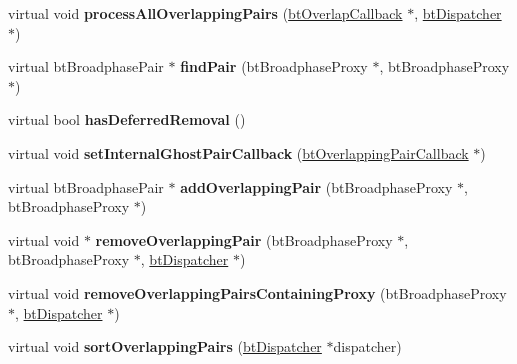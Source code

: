 \begin{DoxyCompactItemize}
\item 
\hypertarget{classbt_null_pair_cache_a39c6b95bf7412b8f37dba2efa633ce09}{virtual void {\bfseries process\+All\+Overlapping\+Pairs} (\hyperlink{structbt_overlap_callback}{bt\+Overlap\+Callback} $\ast$, \hyperlink{classbt_dispatcher}{bt\+Dispatcher} $\ast$)}\label{classbt_null_pair_cache_a39c6b95bf7412b8f37dba2efa633ce09}

\item 
\hypertarget{classbt_null_pair_cache_a1932ebc5d729f0f31528f7647b1c0ab9}{virtual bt\+Broadphase\+Pair $\ast$ {\bfseries find\+Pair} (bt\+Broadphase\+Proxy $\ast$, bt\+Broadphase\+Proxy $\ast$)}\label{classbt_null_pair_cache_a1932ebc5d729f0f31528f7647b1c0ab9}

\item 
\hypertarget{classbt_null_pair_cache_a937a29216d8c7585d8c710f84745bd1b}{virtual bool {\bfseries has\+Deferred\+Removal} ()}\label{classbt_null_pair_cache_a937a29216d8c7585d8c710f84745bd1b}

\item 
\hypertarget{classbt_null_pair_cache_a5cb33e9d3694c71fe68038580da8cc69}{virtual void {\bfseries set\+Internal\+Ghost\+Pair\+Callback} (\hyperlink{classbt_overlapping_pair_callback}{bt\+Overlapping\+Pair\+Callback} $\ast$)}\label{classbt_null_pair_cache_a5cb33e9d3694c71fe68038580da8cc69}

\item 
\hypertarget{classbt_null_pair_cache_a76137e4519323ff5589d5702752bc2cb}{virtual bt\+Broadphase\+Pair $\ast$ {\bfseries add\+Overlapping\+Pair} (bt\+Broadphase\+Proxy $\ast$, bt\+Broadphase\+Proxy $\ast$)}\label{classbt_null_pair_cache_a76137e4519323ff5589d5702752bc2cb}

\item 
\hypertarget{classbt_null_pair_cache_a436b8c6da50f69e53425abb7cdc7976c}{virtual void $\ast$ {\bfseries remove\+Overlapping\+Pair} (bt\+Broadphase\+Proxy $\ast$, bt\+Broadphase\+Proxy $\ast$, \hyperlink{classbt_dispatcher}{bt\+Dispatcher} $\ast$)}\label{classbt_null_pair_cache_a436b8c6da50f69e53425abb7cdc7976c}

\item 
\hypertarget{classbt_null_pair_cache_a87574120b56624b329c0a0faf7fd5461}{virtual void {\bfseries remove\+Overlapping\+Pairs\+Containing\+Proxy} (bt\+Broadphase\+Proxy $\ast$, \hyperlink{classbt_dispatcher}{bt\+Dispatcher} $\ast$)}\label{classbt_null_pair_cache_a87574120b56624b329c0a0faf7fd5461}

\item 
\hypertarget{classbt_null_pair_cache_a12eeb9eea98cf0314d59e65feb95d344}{virtual void {\bfseries sort\+Overlapping\+Pairs} (\hyperlink{classbt_dispatcher}{bt\+Dispatcher} $\ast$dispatcher)}\label{classbt_null_pair_cache_a12eeb9eea98cf0314d59e65feb95d344}

\end{DoxyCompactItemize}



